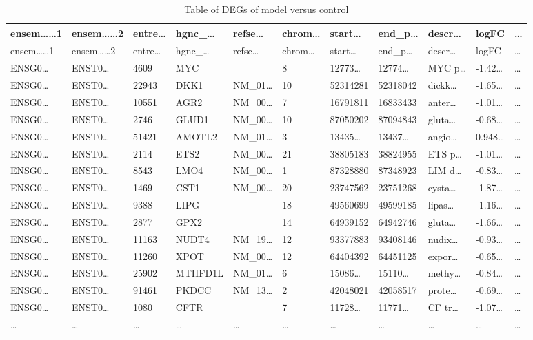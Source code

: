 \documentclass[
]{article}
\begin{document}
\begin{longtable}[]{@{}lllllllllll@{}}
\caption{\label{tab:table-of-DEGs-of-model-versus-control}Table of DEGs of model versus control}\tabularnewline
\toprule
ensem\ldots\ldots1 & ensem\ldots\ldots2 & entre\ldots{} & hgnc\_\ldots{} & refse\ldots{} & chrom\ldots{} & start\ldots{} & end\_p\ldots{} & descr\ldots{} & logFC & \ldots{}\tabularnewline
\midrule
\endfirsthead
\toprule
ensem\ldots\ldots1 & ensem\ldots\ldots2 & entre\ldots{} & hgnc\_\ldots{} & refse\ldots{} & chrom\ldots{} & start\ldots{} & end\_p\ldots{} & descr\ldots{} & logFC & \ldots{}\tabularnewline
\midrule
\endhead
ENSG0\ldots{} & ENST0\ldots{} & 4609 & MYC & & 8 & 12773\ldots{} & 12774\ldots{} & MYC p\ldots{} & -1.42\ldots{} & \ldots{}\tabularnewline
ENSG0\ldots{} & ENST0\ldots{} & 22943 & DKK1 & NM\_01\ldots{} & 10 & 52314281 & 52318042 & dickk\ldots{} & -1.65\ldots{} & \ldots{}\tabularnewline
ENSG0\ldots{} & ENST0\ldots{} & 10551 & AGR2 & NM\_00\ldots{} & 7 & 16791811 & 16833433 & anter\ldots{} & -1.01\ldots{} & \ldots{}\tabularnewline
ENSG0\ldots{} & ENST0\ldots{} & 2746 & GLUD1 & NM\_00\ldots{} & 10 & 87050202 & 87094843 & gluta\ldots{} & -0.68\ldots{} & \ldots{}\tabularnewline
ENSG0\ldots{} & ENST0\ldots{} & 51421 & AMOTL2 & NM\_01\ldots{} & 3 & 13435\ldots{} & 13437\ldots{} & angio\ldots{} & 0.948\ldots{} & \ldots{}\tabularnewline
ENSG0\ldots{} & ENST0\ldots{} & 2114 & ETS2 & NM\_00\ldots{} & 21 & 38805183 & 38824955 & ETS p\ldots{} & -1.01\ldots{} & \ldots{}\tabularnewline
ENSG0\ldots{} & ENST0\ldots{} & 8543 & LMO4 & NM\_00\ldots{} & 1 & 87328880 & 87348923 & LIM d\ldots{} & -0.83\ldots{} & \ldots{}\tabularnewline
ENSG0\ldots{} & ENST0\ldots{} & 1469 & CST1 & NM\_00\ldots{} & 20 & 23747562 & 23751268 & cysta\ldots{} & -1.87\ldots{} & \ldots{}\tabularnewline
ENSG0\ldots{} & ENST0\ldots{} & 9388 & LIPG & & 18 & 49560699 & 49599185 & lipas\ldots{} & -1.16\ldots{} & \ldots{}\tabularnewline
ENSG0\ldots{} & ENST0\ldots{} & 2877 & GPX2 & & 14 & 64939152 & 64942746 & gluta\ldots{} & -1.66\ldots{} & \ldots{}\tabularnewline
ENSG0\ldots{} & ENST0\ldots{} & 11163 & NUDT4 & NM\_19\ldots{} & 12 & 93377883 & 93408146 & nudix\ldots{} & -0.93\ldots{} & \ldots{}\tabularnewline
ENSG0\ldots{} & ENST0\ldots{} & 11260 & XPOT & NM\_00\ldots{} & 12 & 64404392 & 64451125 & expor\ldots{} & -0.65\ldots{} & \ldots{}\tabularnewline
ENSG0\ldots{} & ENST0\ldots{} & 25902 & MTHFD1L & NM\_01\ldots{} & 6 & 15086\ldots{} & 15110\ldots{} & methy\ldots{} & -0.84\ldots{} & \ldots{}\tabularnewline
ENSG0\ldots{} & ENST0\ldots{} & 91461 & PKDCC & NM\_13\ldots{} & 2 & 42048021 & 42058517 & prote\ldots{} & -0.69\ldots{} & \ldots{}\tabularnewline
ENSG0\ldots{} & ENST0\ldots{} & 1080 & CFTR & & 7 & 11728\ldots{} & 11771\ldots{} & CF tr\ldots{} & -1.07\ldots{} & \ldots{}\tabularnewline
\ldots{} & \ldots{} & \ldots{} & \ldots{} & \ldots{} & \ldots{} & \ldots{} & \ldots{} & \ldots{} & \ldots{} & \ldots{}\tabularnewline
\bottomrule
\end{longtable}
\end{document}
